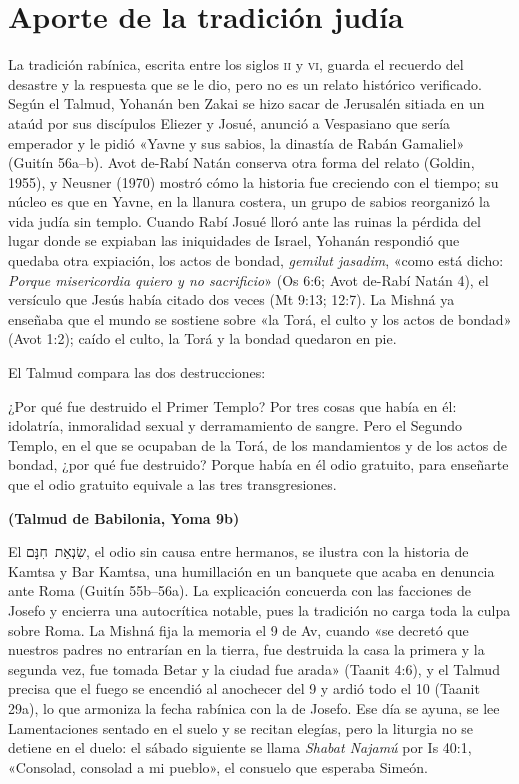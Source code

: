 \documentclass[11pt,letterpaper]{article}
\newcommand{\heb}[1]{\mbox{\foreignlanguage{hebrew}{#1}}}
\newcommand{\fuente}[1]{\par\hfill{\upshape\bfseries\small\textcolor{ladrillo}{#1}}}
\begin{document}
\section{Aporte de la tradición judía}

La tradición rabínica, escrita entre los siglos \textsc{ii} y \textsc{vi}, guarda el recuerdo del desastre y la respuesta que se le dio, pero no es un relato histórico verificado. Según el Talmud, Yohanán ben Zakai se hizo sacar de Jerusalén sitiada en un ataúd por sus discípulos Eliezer y Josué, anunció a Vespasiano que sería emperador y le pidió «Yavne y sus sabios, la dinastía de Rabán Gamaliel» (Guitín 56a--b). Avot de-Rabí Natán conserva otra forma del relato (Goldin, 1955), y Neusner (1970) mostró cómo la historia fue creciendo con el tiempo; su núcleo es que en Yavne, en la llanura costera, un grupo de sabios reorganizó la vida judía sin templo. Cuando Rabí Josué lloró ante las ruinas la pérdida del lugar donde se expiaban las iniquidades de Israel, Yohanán respondió que quedaba otra expiación, los actos de bondad, \emph{gemilut jasadim}, «como está dicho: \emph{Porque misericordia quiero y no sacrificio}» (Os 6:6; Avot de-Rabí Natán 4), el versículo que Jesús había citado dos veces (Mt 9:13; 12:7). La Mishná ya enseñaba que el mundo se sostiene sobre «la Torá, el culto y los actos de bondad» (Avot 1:2); caído el culto, la Torá y la bondad quedaron en pie.

El Talmud compara las dos destrucciones:

\begin{cita}¿Por qué fue destruido el Primer Templo? Por tres cosas que había en él: idolatría, inmoralidad sexual y derramamiento de sangre. Pero el Segundo Templo, en el que se ocupaban de la Torá, de los mandamientos y de los actos de bondad, ¿por qué fue destruido? Porque había en él odio gratuito, para enseñarte que el odio gratuito equivale a las tres transgresiones.\fuente{(Talmud de Babilonia, Yoma 9b)}\end{cita}

El \heb{שִׂנְאַת חִנָּם}, el odio sin causa entre hermanos, se ilustra con la historia de Kamtsa y Bar Kamtsa, una humillación en un banquete que acaba en denuncia ante Roma (Guitín 55b--56a). La explicación concuerda con las facciones de Josefo y encierra una autocrítica notable, pues la tradición no carga toda la culpa sobre Roma. La Mishná fija la memoria el 9 de Av, cuando «se decretó que nuestros padres no entrarían en la tierra, fue destruida la casa la primera y la segunda vez, fue tomada Betar y la ciudad fue arada» (Taanit 4:6), y el Talmud precisa que el fuego se encendió al anochecer del 9 y ardió todo el 10 (Taanit 29a), lo que armoniza la fecha rabínica con la de Josefo. Ese día se ayuna, se lee Lamentaciones sentado en el suelo y se recitan elegías, pero la liturgia no se detiene en el duelo: el sábado siguiente se llama \emph{Shabat Najamú} por Is 40:1, «Consolad, consolad a mi pueblo», el consuelo que esperaba Simeón.
\end{document}
